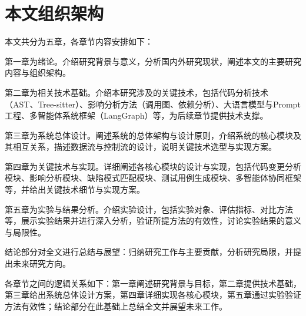 \section{本文组织架构}
本文共分为五章，各章节内容安排如下：

第一章为绪论。介绍研究背景与意义，分析国内外研究现状，阐述本文的主要研究内容与组织架构。

第二章为相关技术基础。介绍本研究涉及的关键技术，包括代码分析技术（AST、Tree-sitter）、影响分析方法（调用图、依赖分析）、大语言模型与Prompt工程、多智能体系统框架（LangGraph）等，为后续章节提供技术支撑。

第三章为系统总体设计。阐述系统的总体架构与设计原则，介绍系统的核心模块及其相互关系，描述数据流与控制流的设计，说明关键技术选型与实现方案。

第四章为关键技术与实现。详细阐述各核心模块的设计与实现，包括代码变更分析模块、影响分析模块、缺陷模式匹配模块、测试用例生成模块、多智能体协同框架等，并给出关键技术细节与实现方案。

第五章为实验与结果分析。介绍实验设计，包括实验对象、评估指标、对比方法等，展示实验结果并进行深入分析，验证所提方法的有效性，讨论实验结果的意义与局限性。

结论部分对全文进行总结与展望：归纳研究工作与主要贡献，分析研究局限，并提出未来研究方向。

各章节之间的逻辑关系如下：第一章阐述研究背景与目标，第二章提供技术基础，第三章给出系统总体设计方案，第四章详细实现各核心模块，第五章通过实验验证方法有效性；结论部分在此基础上总结全文并展望未来工作。
